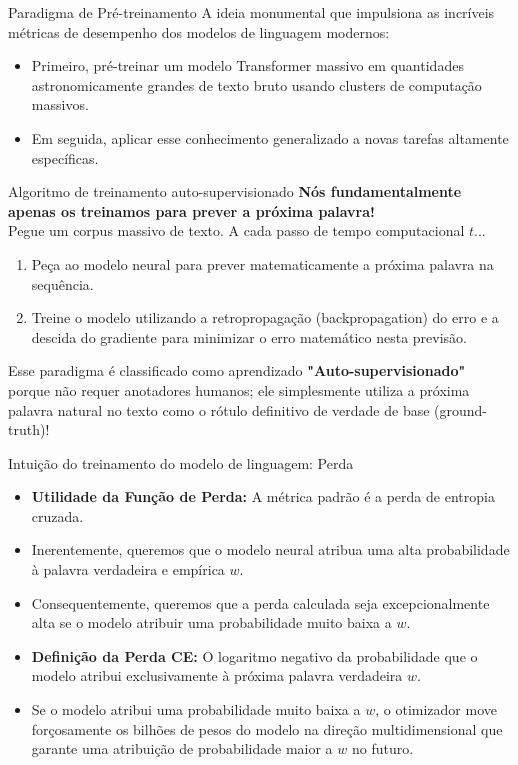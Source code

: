 \documentclass[aspectratio=169]{beamer}
\begin{document}
\begin{frame}{Paradigma de Pré-treinamento}\justifying
    A ideia monumental que impulsiona as incríveis métricas de desempenho dos modelos de linguagem modernos:
    \begin{itemize}
        \item Primeiro, pré-treinar um modelo Transformer massivo em quantidades astronomicamente grandes de texto bruto usando clusters de computação massivos.
        \item Em seguida, aplicar esse conhecimento generalizado a novas tarefas altamente específicas.
    \end{itemize}
\end{frame}

\begin{frame}{Algoritmo de treinamento auto-supervisionado}\justifying
    \textbf{Nós fundamentalmente apenas os treinamos para prever a próxima palavra!} \\
    Pegue um corpus massivo de texto. A cada passo de tempo computacional $t$...
    \begin{enumerate}
        \item Peça ao modelo neural para prever matematicamente a próxima palavra na sequência.
        \item Treine o modelo utilizando a retropropagação (backpropagation) do erro e a descida do gradiente para minimizar o erro matemático nesta previsão.
    \end{enumerate}
    \vspace{0.5cm}
    Esse paradigma é classificado como aprendizado \textbf{"Auto-supervisionado"} porque não requer anotadores humanos; ele simplesmente utiliza a próxima palavra natural no texto como o rótulo definitivo de verdade de base (ground-truth)!
\end{frame}

\begin{frame}{Intuição do treinamento do modelo de linguagem: Perda}\justifying
    \begin{itemize}
        \item \textbf{Utilidade da Função de Perda:} A métrica padrão é a perda de entropia cruzada.
        \item Inerentemente, queremos que o modelo neural atribua uma alta probabilidade à palavra verdadeira e empírica $w$.
        \item Consequentemente, queremos que a perda calculada seja excepcionalmente alta se o modelo atribuir uma probabilidade muito baixa a $w$.
        \item \textbf{Definição da Perda CE:} O logaritmo negativo da probabilidade que o modelo atribui exclusivamente à próxima palavra verdadeira $w$.
        \item Se o modelo atribui uma probabilidade muito baixa a $w$, o otimizador move forçosamente os bilhões de pesos do modelo na direção multidimensional que garante uma atribuição de probabilidade maior a $w$ no futuro.
    \end{itemize}
\end{frame}
\end{document}
